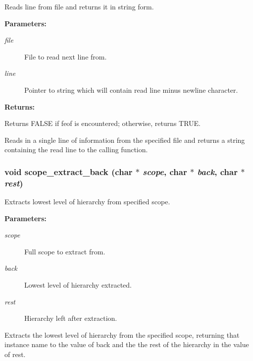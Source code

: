 Reads line from file and returns it in string form.

\begin{Desc}
\item[{\bf Parameters: }]\par
\begin{description}
\item[
{\em file}]File to read next line from. \item[
{\em line}]Pointer to string which will contain read line minus newline character.

\end{description}
\end{Desc}
\begin{Desc}
\item[{\bf Returns: }]\par
Returns FALSE if feof is encountered; otherwise, returns TRUE.

\end{Desc}
Reads in a single line of information from the specified file and returns a string containing the read line to the calling function. 
\subsubsection{\setlength{\rightskip}{0pt plus 5cm}void scope\_\-extract\_\-back (char $\ast$ {\em scope}, char $\ast$ {\em back}, char $\ast$ {\em rest})}\label{util_8h_a10}


Extracts lowest level of hierarchy from specified scope.

\begin{Desc}
\item[{\bf Parameters: }]\par
\begin{description}
\item[
{\em scope}]Full scope to extract from. \item[
{\em back}]Lowest level of hierarchy extracted. \item[
{\em rest}]Hierarchy left after extraction.

\end{description}
\end{Desc}
Extracts the lowest level of hierarchy from the specified scope, returning that instance name to the value of back and the the rest of the hierarchy in the value of rest. 
